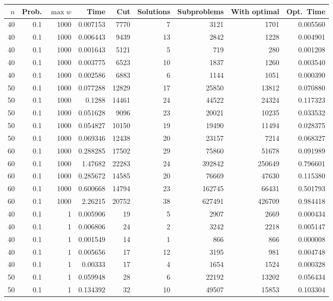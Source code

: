 \documentclass[a4paper,11pt]{article}
\begin{document}
\begin{table}
\begin{center}
\begin{tabular}{|rrr|r|r|rrr|r|}
\hline
$n$ & Prob. & $\max w$ & Time & Cut & Solutions & Subproblems & With
optimal & Opt.\ Time \\
\hline
40 & 0.1 & 1000 & 0.007153 & 7770 & 7 & 3121 & 1701 & 0.005560 \\
40 & 0.1 & 1000 & 0.006443 & 9439 & 13 & 2842 & 1228 & 0.004901 \\
40 & 0.1 & 1000 & 0.001643 & 5121 & 5 & 719 & 280 & 0.001208 \\
40 & 0.1 & 1000 & 0.003775 & 6523 & 10 & 1837 & 1260 & 0.003540 \\
40 & 0.1 & 1000 & 0.002586 & 6883 & 6 & 1144 & 1051 & 0.000390 \\
50 & 0.1 & 1000 & 0.077288 & 12829 & 17 & 25850 & 13812 & 0.070880 \\
50 & 0.1 & 1000 & 0.1288 & 14461 & 24 & 44522 & 24324 & 0.117323 \\
50 & 0.1 & 1000 & 0.051628 & 9096 & 23 & 20021 & 10235 & 0.033532 \\
50 & 0.1 & 1000 & 0.054827 & 10150 & 19 & 19490 & 11494 & 0.028375 \\
50 & 0.1 & 1000 & 0.069346 & 12438 & 20 & 23157 & 7214 & 0.068327 \\
60 & 0.1 & 1000 & 0.288285 & 17502 & 29 & 75860 & 51678 & 0.091989 \\
60 & 0.1 & 1000 & 1.47682 & 22283 & 24 & 392842 & 250649 & 0.796601 \\
60 & 0.1 & 1000 & 0.285672 & 14585 & 20 & 76669 & 47630 & 0.115380 \\
60 & 0.1 & 1000 & 0.600668 & 14794 & 23 & 162745 & 66431 & 0.501793 \\
60 & 0.1 & 1000 & 2.26215 & 20752 & 38 & 627491 & 426709 & 0.984418 \\
\hline
40 & 0.1 & 1 & 0.005906 & 19 & 5 & 2907 & 2669 & 0.000434 \\
40 & 0.1 & 1 & 0.006806 & 24 & 2 & 3242 & 2218 & 0.005147 \\
40 & 0.1 & 1 & 0.001549 & 14 & 1 & 866 & 866 & 0.000008 \\
40 & 0.1 & 1 & 0.005656 & 17 & 12 & 3195 & 981 & 0.004748 \\
40 & 0.1 & 1 & 0.00333 & 17 & 4 & 1654 & 1524 & 0.000328 \\
50 & 0.1 & 1 & 0.059948 & 28 & 6 & 22192 & 13202 & 0.056434 \\
50 & 0.1 & 1 & 0.134392 & 32 & 10 & 49507 & 15853 & 0.103304 \\

\end{tabular}
\end{center}
\end{table}
\end{document}
